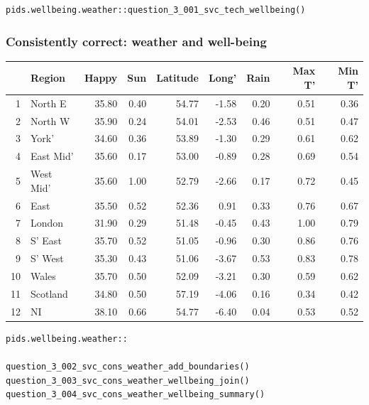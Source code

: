 \documentclass[12pt, oneside, openany]{book}
\begin{document}
\bigskip
\begin{lstlisting}
pids.wellbeing.weather::question_3_001_svc_tech_wellbeing()
\end{lstlisting}

\subsubsection*{Consistently correct: weather and well-being}

\begin{table}[ht]
\centering
\begin{tabular}{rlrrrrrrr}
  \hline
 & Region & Happy & Sun & Latitude & Long' & Rain & Max T' & Min T' \\ 
  \hline
1 & North E & 35.80 & 0.40 & 54.77 & -1.58 & 0.20 & 0.51 & 0.36 \\ 
  2 & North W & 35.90 & 0.24 & 54.01 & -2.53 & 0.46 & 0.51 & 0.47 \\ 
  3 & York' & 34.60 & 0.36 & 53.89 & -1.30 & 0.29 & 0.61 & 0.62 \\ 
  4 & East Mid' & 35.60 & 0.17 & 53.00 & -0.89 & 0.28 & 0.69 & 0.54 \\ 
  5 & West Mid' & 35.60 & 1.00 & 52.79 & -2.66 & 0.17 & 0.72 & 0.45 \\ 
  6 & East & 35.50 & 0.52 & 52.36 & 0.91 & 0.33 & 0.76 & 0.67 \\ 
  7 & London & 31.90 & 0.29 & 51.48 & -0.45 & 0.43 & 1.00 & 0.79 \\ 
  8 & S' East & 35.70 & 0.52 & 51.05 & -0.96 & 0.30 & 0.86 & 0.76 \\ 
  9 & S' West & 35.30 & 0.43 & 51.06 & -3.67 & 0.53 & 0.83 & 0.78 \\ 
  10 & Wales & 35.70 & 0.50 & 52.09 & -3.21 & 0.30 & 0.59 & 0.62 \\ 
  11 & Scotland & 34.80 & 0.50 & 57.19 & -4.06 & 0.16 & 0.34 & 0.42 \\ 
  12 & NI & 38.10 & 0.66 & 54.77 & -6.40 & 0.04 & 0.53 & 0.52 \\ 
   \hline
\end{tabular}
\end{table}

\bigskip
\begin{lstlisting}
pids.wellbeing.weather::

question_3_002_svc_cons_weather_add_boundaries()
question_3_003_svc_cons_weather_wellbeing_join()
question_3_004_svc_cons_weather_wellbeing_summary()
\end{lstlisting}
\end{document}
